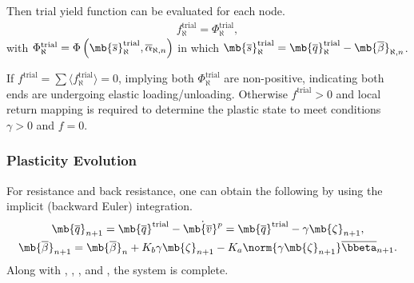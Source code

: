 Then trial yield function can be evaluated for each node.
\begin{gather}\label{eq:nm_f_trial}
f_\aleph^\text{trial}=\Phi_\aleph^\text{trial},
\end{gather}
with $\Phi_\aleph^\text{trial}=\Phi\left(\mb{\overline{s}}_\aleph^\text{trial},\overline{\alpha}_{\aleph,n}\right)$ in which $\mb{\overline{s}}_\aleph^\text{trial}=\mb{\overline{q}}_\aleph^\text{trial}-\mb{\overline{\beta}}_{\aleph,n}$.

If $f^\text{trial}=\sum{}\langle{}f_\aleph^\text{trial}\rangle=0$, implying both $\Phi_\aleph^\text{trial}$ are non-positive, indicating both ends are undergoing elastic loading/unloading. Otherwise $f^\text{trial}>0$ and local return mapping is required to determine the plastic state to meet conditions $\gamma>0$ and $f=0$.
\subsubsection{Plasticity Evolution}
For resistance and back resistance, one can obtain the following by using the implicit (backward Euler) integration.
\begin{gather}\label{eq:nm_qc}
\mb{\overline{q}}_{n+1}=\mb{\overline{q}}^\text{trial}-\dot{\mb{\overline{v}}^p}=\mb{\overline{q}}^\text{trial}-\gamma\mb{\zeta}_{n+1},\\
\mb{\overline{\beta}}_{n+1}=\mb{\overline{\beta}}_{n}+K_b\gamma\mb{\zeta}_{n+1}-K_a\norm{\gamma\mb{\zeta}_{n+1}}\overline{\bbeta}_{n+1}.
\end{gather}
Along with , , ,  and , the system is complete.
